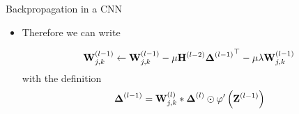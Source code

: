 \documentclass{beamer}
\begin{document}
\begin{frame}{Backpropagation in a CNN}
    \begin{itemize}
        \item  Therefore we can write 

\begin{equation}\label{eq:bp_update_CNN2}
    {\bf W}^{(l-1)}_{j,k} \leftarrow  {\bf W}^{(l-1)}_{j,k} - \mu   {{\bf H}^{(l-2)}} {{\boldsymbol \Delta}^{(l-1)}}^\top - \mu \lambda {\bf W}^{(l-1)}_{j,k}
\end{equation}
with the definition  
\begin{equation}\label{eq:general_error_term_CNN2}
    {\boldsymbol \Delta}^{(l-1)} = {\bf W}_{j,k}^ {(l)}*{\boldsymbol \Delta}^{(l)}\odot
    \varphi'\left({\bf Z}^{(l-1)}\right)
\end{equation}
    \end{itemize}
\end{frame}
\end{document}
